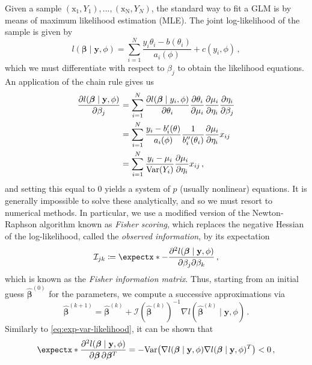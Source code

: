 \documentclass[a4paper]{book}
\begin{document}
Given a sample $(\bm{\mathrm{x_1}}, Y_1), \dots, (\bm{\mathrm{x_N}}, Y_N)$, the standard way to fit a GLM is by means of maximum likelihood estimation (MLE). The joint log-likelihood of the sample is given by
\begin{equation} \label{eq:joint-log-likelihood}
  l(\bm{\beta} \mid \mathbf{y}, \phi) = \sum_{i = 1}^N \frac{y_i \theta_i - b(\theta_i)}{a_i(\phi)} + c(y_i, \phi) \,,
\end{equation}
which we must differentiate with respect to $\beta_j$ to obtain the likelihood equations. An application of the chain rule gives us 
\begin{align}
  \frac{\partial l(\bm{\beta} \mid \mathbf{y}, \phi)}{\partial \beta_j} &= \sum_{i = 1}^N \frac{\partial l(\bm{\beta} \mid y_i, \phi)}{\partial \theta_i} \frac{\partial \theta_i}{\partial \mu_i} \pdv{\mu_i}{\eta_i} \frac{\partial \eta_i}{\partial \beta_j} \\
  &= \sum_{i = 1}^N \frac{y_i - b'_i(\theta)}{a_i(\phi)} \frac{1}{b_i''(\theta_i)} \pdv{\mu_i}{\eta_i} x_{ij} \\
  &= \sum_{i = 1}^N \frac{y_i - \mu_i}{\var{Y_i}} \pdv{\mu_i}{\eta_i} x_{ij} \,, \label{eq:grad-likelihood}
\end{align}
and setting this equal to $0$ yields a system of $p$ (usually nonlinear) equations. It is generally impossible to solve these analytically, and so we must resort to numerical methods. In particular, we use a modified version of the Newton-Raphson algorithm known as \emph{Fisher scoring}, which replaces the negative Hessian of the log-likelihood, called the \emph{observed information}, by its expectation
\begin{equation}
  \mathcal{I}_{jk} \coloneqq \expect{-\frac{\partial^2 l(\bm{\beta} \mid \mathbf{y}, \phi)}{\partial \beta_j \partial \beta_k}} \,,
\end{equation}
which is known as the \emph{Fisher information matrix}. Thus, starting from an initial guess $\bm{\widehat{\beta}}^{(0)}$ for the parameters, we compute a successive approximations via
\begin{equation} \label{eq:fisher-scoring}
  \bm{\widehat{\beta}}^{(k + 1)} = \bm{\widehat{\beta}}^{(k)} + \mathcal{I}(\bm{\widehat{\beta}}^{(k)})^{-1} \nabla l(\bm{\widehat{\beta}}^{(k)} \mid \mathbf{y}, \phi) \,.
\end{equation}
Similarly to \cref{eq:exp-var-likelihood}, it can be shown that
\begin{equation}
  \expect{\pdv{l(\bm{\beta} \mid \mathbf{y}, \phi)}{\bm{\beta}, \bm{\beta}^T}} = -\var{\nabla l(\bm{\beta} \mid \mathbf{y}, \phi) \nabla l(\bm{\beta} \mid \mathbf{y}, \phi)^T} < 0 \,,
\end{equation}
\end{document}
